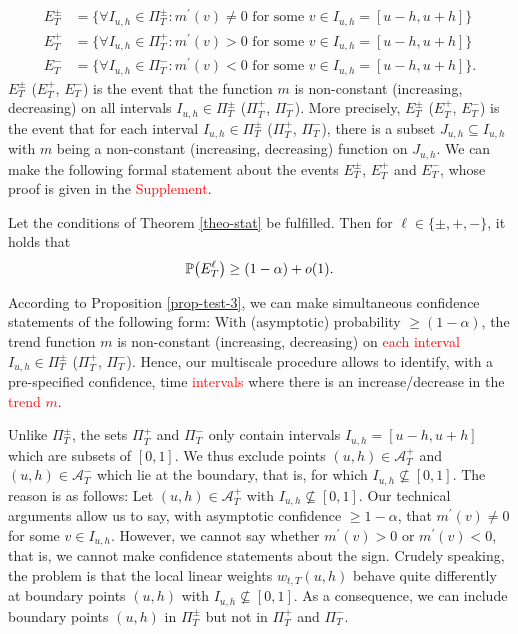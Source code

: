 \begin{align*}
E_T^\pm & = \Big\{ \forall I_{u,h} \in \Pi_T^\pm: m^\prime(v) \ne 0 \text{ for some } v \in I_{u,h} = [u-h,u+h] \Big\} \\
E_T^+  & = \Big\{ \forall I_{u,h} \in \Pi_T^+: m^\prime(v) > 0 \text{ for some } v \in I_{u,h} = [u-h,u+h] \Big\} \\
E_T^-  & = \Big\{ \forall I_{u,h} \in \Pi_T^-: m^\prime(v) < 0 \text{ for some } v \in I_{u,h} = [u-h,u+h] \Big\}.
\end{align*}
$E_T^\pm$ ($E_T^+$, $E_T^-$) is the event that the function $m$ is non-constant (increasing, decreasing) on all intervals $I_{u,h} \in \Pi_T^\pm$ ($\Pi_T^+$, $\Pi_T^-$). More precisely, $E_T^\pm$ ($E_T^+$, $E_T^-$) is the event that for each interval $I_{u,h} \in \Pi_T^\pm$ ($\Pi_T^+$, $\Pi_T^-$), there is a subset $J_{u,h} \subseteq I_{u,h}$ with $m$ being a non-constant (increasing, decreasing) function on $J_{u,h}$. We can make the following formal statement about the events $E_T^\pm$, $E_T^+$ and $E_T^-$, whose proof is given in the \textcolor{red}{Supplement}. 
\begin{prop}\label{prop-test-3}
Let the conditions of Theorem \ref{theo-stat} be fulfilled. Then for $\ell \in \{ \pm,+,-\}$, it holds that
\[ \mathbb{P} \big( E_T^\ell \big) \ge (1-\alpha) + o(1). \]
\end{prop}
According to Proposition \ref{prop-test-3}, we can make simultaneous confidence statements of the following form: With (asymptotic) probability $\ge (1-\alpha)$, the trend function $m$ is non-constant (increasing, decreasing) on \textcolor{red}{each interval} $I_{u,h} \in \Pi_T^\pm$ ($\Pi_T^+$, $\Pi_T^-$). Hence, our multiscale procedure allows to identify, with a pre-specified confidence, time \textcolor{red}{intervals} where there is an increase/decrease in the \textcolor{red}{trend $m$}. 


\begin{remark}
Unlike $\Pi_T^\pm$, the sets $\Pi_T^+$ and $\Pi_T^-$ only contain intervals $I_{u,h} = [u-h,u+h]$ which are subsets of $[0,1]$. We thus exclude points $(u,h) \in \mathcal{A}_T^+$ and $(u,h) \in \mathcal{A}_T^-$ which lie at the boundary, that is, for which $I_{u,h} \nsubseteq [0,1]$. The reason is as follows: Let $(u,h) \in \mathcal{A}_T^+$ with $I_{u,h} \nsubseteq [0,1]$. Our technical arguments allow us to say, with asymptotic confidence $\ge 1 - \alpha$, that $m^\prime(v) \ne 0$ for some $v \in I_{u,h}$. However, we cannot say whether $m^\prime(v) > 0$ or $m^\prime(v) < 0$, that is, we cannot make confidence statements about the sign. Crudely speaking, the problem is that the local linear weights $w_{t,T}(u,h)$ behave quite differently at boundary points $(u,h)$ with $I_{u,h} \nsubseteq [0,1]$. As a consequence, we can include boundary points $(u,h)$ in $\Pi_T^\pm$ but not in $\Pi_T^+$ and $\Pi_T^-$.
\end{remark}
 

